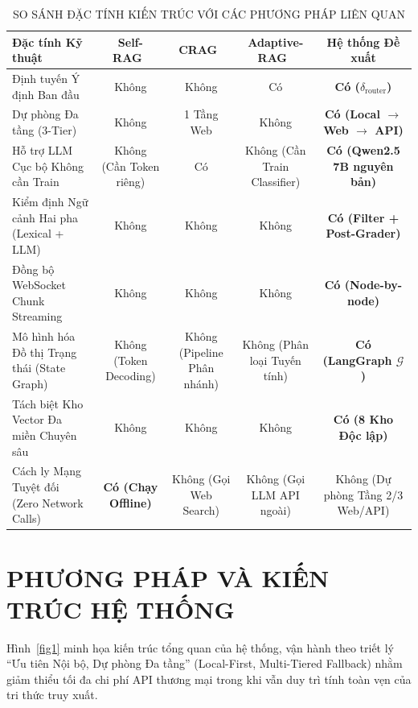 \documentclass[conference]{IEEEtran}
\begin{document}
\begin{table}[htbp]
\centering
\caption{SO SÁNH ĐẶC TÍNH KIẾN TRÚC VỚI CÁC PHƯƠNG PHÁP LIÊN QUAN}
\label{tab:comparison}
\begin{tabular}{lcccc}
\toprule
\textbf{Đặc tính Kỹ thuật} & \textbf{Self-RAG~\cite{asai2023self}} & \textbf{CRAG~\cite{yan2024corrective}} & \textbf{Adaptive-RAG~\cite{jeong2024adaptive}} & \textbf{Hệ thống Đề xuất} \\
\midrule
Định tuyến Ý định Ban đầu & Không & Không & Có & \textbf{Có ($\delta_{\text{router}}$)} \\
Dự phòng Đa tầng (3-Tier) & Không & 1 Tầng Web & Không & \textbf{Có (Local $\rightarrow$ Web $\rightarrow$ API)} \\
Hỗ trợ LLM Cục bộ Không cần Train & Không (Cần Token riêng) & Có & Không (Cần Train Classifier) & \textbf{Có (Qwen2.5 7B nguyên bản)} \\
Kiểm định Ngữ cảnh Hai pha (Lexical + LLM) & Không & Không & Không & \textbf{Có (Filter + Post-Grader)} \\
Đồng bộ WebSocket Chunk Streaming & Không & Không & Không & \textbf{Có (Node-by-node)} \\
Mô hình hóa Đồ thị Trạng thái (State Graph) & Không (Token Decoding) & Không (Pipeline Phân nhánh) & Không (Phân loại Tuyến tính) & \textbf{Có (LangGraph $\mathcal{G}$)} \\
Tách biệt Kho Vector Đa miền Chuyên sâu & Không & Không & Không & \textbf{Có (8 Kho Độc lập)} \\
Cách ly Mạng Tuyệt đối (Zero Network Calls) & \textbf{Có (Chạy Offline)} & Không (Gọi Web Search) & Không (Gọi LLM API ngoài) & Không (Dự phòng Tầng 2/3 Web/API) \\
\bottomrule
\end{tabular}
\end{table}

\section{PHƯƠNG PHÁP VÀ KIẾN TRÚC HỆ THỐNG}

Hình~\ref{fig1} minh họa kiến trúc tổng quan của hệ thống, vận hành theo triết lý ``Ưu tiên Nội bộ, Dự phòng Đa tầng'' (Local-First, Multi-Tiered Fallback) nhằm giảm thiểu tối đa chi phí API thương mại trong khi vẫn duy trì tính toàn vẹn của tri thức truy xuất.
\end{document}
